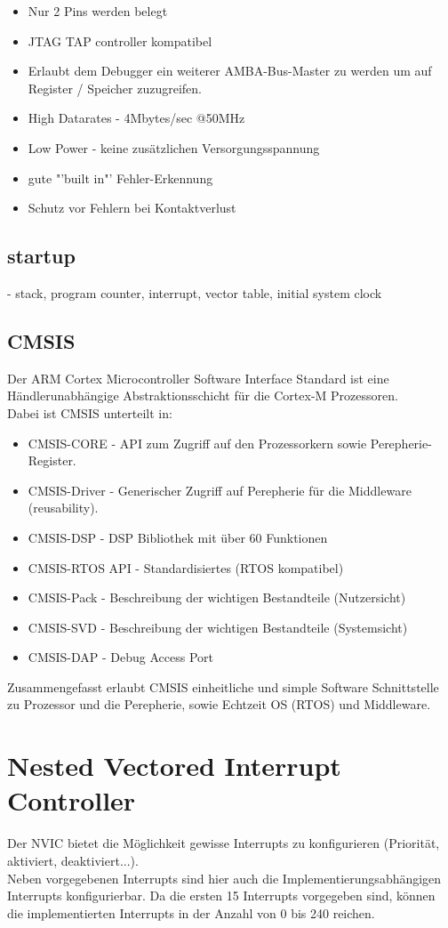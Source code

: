 \begin{itemize}
\item Nur 2 Pins werden belegt
\item JTAG TAP controller kompatibel
\item Erlaubt dem Debugger ein weiterer AMBA-Bus-Master zu werden um auf
Register / Speicher zuzugreifen.
\item High Datarates - 4Mbytes/sec @50MHz
\item Low Power - keine zus\"atzlichen Versorgungsspannung
\item gute "'built in"' Fehler-Erkennung
\item Schutz vor Fehlern bei Kontaktverlust
\end{itemize}  

\section{startup}
 - stack, program counter, interrupt, vector table, initial system clock

\section{CMSIS}
Der ARM Cortex Microcontroller Software Interface Standard ist eine 
H\"andlerunabh\"angige Abstraktionsschicht f\"ur die Cortex-M Prozessoren.\\
Dabei ist CMSIS unterteilt in:
\begin{itemize}
\item CMSIS-CORE - API zum Zugriff auf den Prozessorkern sowie Perepherie-Register.
\item CMSIS-Driver - Generischer Zugriff auf Perepherie f\"ur die Middleware
			(reusability).
\item CMSIS-DSP - DSP Bibliothek mit \"uber 60 Funktionen
\item CMSIS-RTOS API - Standardisiertes (RTOS kompatibel)
\item CMSIS-Pack - Beschreibung der wichtigen Bestandteile (Nutzersicht)
\item CMSIS-SVD - Beschreibung der wichtigen Bestandteile (Systemsicht)
\item CMSIS-DAP - Debug Access Port
\end{itemize}

Zusammengefasst erlaubt CMSIS einheitliche und simple Software Schnittstelle
zu Prozessor und die Perepherie, sowie Echtzeit OS (RTOS) und Middleware.

\chapter{Nested Vectored Interrupt Controller}
Der NVIC bietet die M\"oglichkeit gewisse Interrupts zu konfigurieren
(Priorit\"at, aktiviert, deaktiviert...). \\
Neben vorgegebenen Interrupts sind hier auch die Implementierungsabh\"angigen
Interrupts konfigurierbar. Da die ersten 15 Interrupts vorgegeben sind, k\"onnen
die implementierten Interrupts in der Anzahl von 0 bis 240 reichen.

